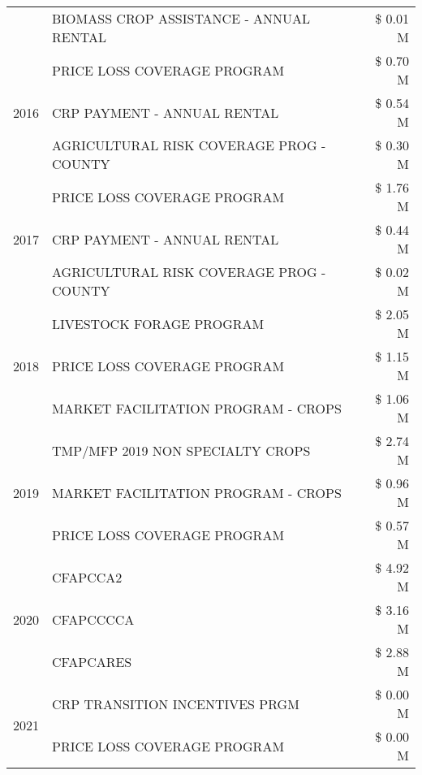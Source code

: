 \begin{tabular}{llr}
 & BIOMASS CROP ASSISTANCE - ANNUAL RENTAL & \$ 0.01 M \\
\cline{1-3}
\multirow[t]{3}{*}{2016} & PRICE LOSS COVERAGE PROGRAM & \$ 0.70 M \\
 & CRP PAYMENT - ANNUAL RENTAL & \$ 0.54 M \\
 & AGRICULTURAL RISK COVERAGE PROG - COUNTY & \$ 0.30 M \\
\cline{1-3}
\multirow[t]{3}{*}{2017} & PRICE LOSS COVERAGE PROGRAM & \$ 1.76 M \\
 & CRP PAYMENT - ANNUAL RENTAL & \$ 0.44 M \\
 & AGRICULTURAL RISK COVERAGE PROG - COUNTY & \$ 0.02 M \\
\cline{1-3}
\multirow[t]{3}{*}{2018} & LIVESTOCK FORAGE PROGRAM & \$ 2.05 M \\
 & PRICE LOSS COVERAGE PROGRAM & \$ 1.15 M \\
 & MARKET FACILITATION PROGRAM - CROPS & \$ 1.06 M \\
\cline{1-3}
\multirow[t]{3}{*}{2019} & TMP/MFP 2019 NON SPECIALTY CROPS & \$ 2.74 M \\
 & MARKET FACILITATION PROGRAM - CROPS & \$ 0.96 M \\
 & PRICE LOSS COVERAGE PROGRAM & \$ 0.57 M \\
\cline{1-3}
\multirow[t]{3}{*}{2020} & CFAPCCA2 & \$ 4.92 M \\
 & CFAPCCCCA & \$ 3.16 M \\
 & CFAPCARES & \$ 2.88 M \\
\cline{1-3}
\multirow[t]{2}{*}{2021} & CRP TRANSITION INCENTIVES PRGM & \$ 0.00 M \\
 & PRICE LOSS COVERAGE PROGRAM & \$ 0.00 M \\
\cline{1-3}
\bottomrule
\end{tabular}
